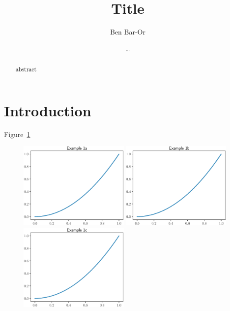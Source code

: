 \documentclass[times,twocolumn]{aastex62}
\begin{document}
\title{Title}

\author{Ben Bar-Or}

\author{\dots}


\begin{abstract}
  abstract
\end{abstract}


\section{Introduction}
Figure~\ref{fig:example1}

\cite{Bar-Or+2016} 

\begin{figure}[h]
  \includegraphics[width=0.48\textwidth]{figures/example_1a}
  \includegraphics[width=0.48\textwidth]{figures/example_1b}
  \includegraphics[width=0.48\textwidth]{figures/example_1c}
\caption{\label{fig:example1}}
\end{figure}
\end{document}
